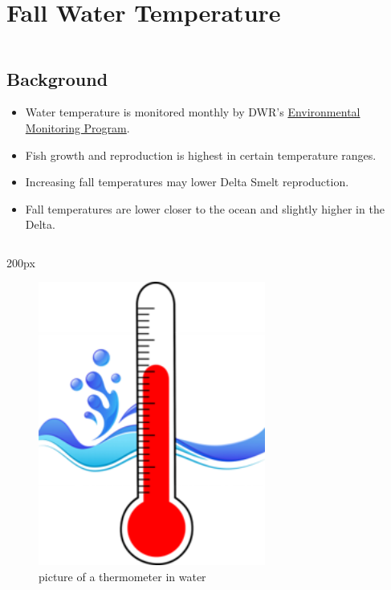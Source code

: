 \documentclass[
]{book}
\providecommand{\tightlist}{%
  \setlength{\itemsep}{0pt}\setlength{\parskip}{0pt}}
\begin{document}
\hypertarget{fall-water-temperature}{%
\section{Fall Water Temperature}\label{fall-water-temperature}}

\begin{column}{0.7\textwidth}
\hypertarget{background-13}{%
\subsection{Background}\label{background-13}}

\begin{itemize}
\tightlist
\item
  Water temperature is monitored monthly by DWR's \href{https://emp.baydeltalive.com/wiki/12297}{Environmental Monitoring Program}.
\item
  Fish growth and reproduction is highest in certain temperature ranges.
\item
  Increasing fall temperatures may lower Delta Smelt reproduction.
\item
  Fall temperatures are lower closer to the ocean and slightly higher in the Delta.
\end{itemize}
\end{column}

\begin{column}{200px\textwidth}
\begin{figure}

{\centering \includegraphics[width=2.94in]{figures/thermometer} 

}

\caption{picture of a thermometer in water}\label{fig:unnamed-chunk-100}
\end{figure}
\end{column}
\end{document}
